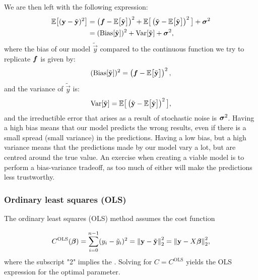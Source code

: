 We are then left with the following expression:
\begin{align*}
    \mathbb{E}\big[(\mathbf{y}-\tilde{\mathbf{y}})^2\big] &= \left(\boldsymbol{f}-\mathbb{E}\big[\tilde{\mathbf{y}}\big]\right)^2+ \mathbb{E}\big[\left(\tilde{\mathbf{y}}-\mathbb{E}\big[\tilde{\mathbf{y}}\big]\right)^2\big] + \boldsymbol{\sigma}^2 \\
    &= (\mathrm{Bias}[\tilde{\mathbf{y}}])^2 + \mathrm{Var}[{\tilde{\mathbf{y}}}]+ \boldsymbol{\sigma}^2,
\end{align*}
where the bias of our model $\tilde{\vec{y}}$ compared to the continuous function we try to replicate $\boldsymbol{f}$ is given by:
\begin{align*}
    (\mathrm{Bias}[\tilde{\mathbf{y}}])^2 = \left(\boldsymbol{f}-\mathbb{E}\big[\tilde{\mathbf{y}}\big]\right)^2,
\end{align*}
and the variance of $\tilde{\vec{y}}$ is:
\begin{align*}
    \mathrm{Var}[{\tilde{\mathbf{y}}}] = \mathbb{E}\big[\left(\tilde{\mathbf{y}}-\mathbb{E}\big[\tilde{\mathbf{y}}\big]\right)^2\big],
\end{align*}
and the irreductible error that arises as a result of stochastic noise is $\boldsymbol{\sigma}^2$. Having a high bias means that our model predicts the wrong results, even if there is a small spread (small variance) in the predictions. Having a low bias, but a high variance means that the predictions made by our model vary a lot, but are centred around the true value. An exercise when creating a viable model is to perform a bias-variance tradeoff, as too much of either will make the predictions less trustworthy. 







\subsubsection{Ordinary least squares (OLS)}\label{sec:OLS}

The ordinary least squares (OLS) method assumes the cost function

\begin{align*}
    C^\text{OLS}(\boldsymbol{\beta}) = \sum_{i=0}^{n-1}(y_i - \tilde{y}_i)^2 =  \norm{\mathbf{y}-\tilde{\mathbf{y}}}_2^{2} = \norm{\mathbf{y}-X\boldsymbol{\beta}}_2^{2},
\end{align*}
where the subscript "2" implies the \footnotemark. Solving  for $C=C^\text{OLS}$ yields the OLS expression for the optimal parameter.

